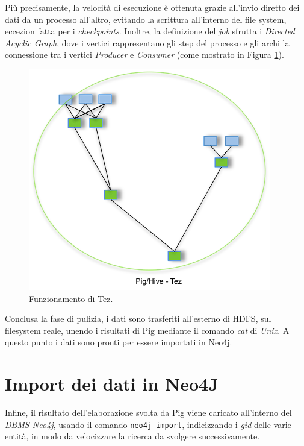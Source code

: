 \documentclass[12pt, a4paper, twocolumn]{article} %
\begin{document}
Più precisamente, la velocità di esecuzione è ottenuta grazie all'invio diretto dei dati da un processo all'altro, evitando la scrittura all'interno del file system, eccezion fatta per i \textit{checkpoints}.
Inoltre, la definizione del \textit{job} sfrutta i \textit{Directed Acyclic Graph}, dove i vertici rappresentano gli step del processo e gli archi la connessione tra i vertici \textit{Producer} e \textit{Consumer} (come mostrato in Figura \ref{fig:Tez}).

\begin{figure}
  \centering
  \includegraphics[width=0.9\linewidth]{tez.png}
  \caption{Funzionamento di Tez.}
  \label{fig:Tez}
\end{figure}

Conclusa la fase di pulizia, i dati sono trasferiti all'esterno di HDFS, sul filesystem reale, unendo i risultati di Pig  mediante il comando \textit{cat} di \textit{Unix}. 
A questo punto i dati sono pronti per essere importati in Neo4j.


\section{Import dei dati in Neo4J}
Infine, il risultato dell'elaborazione svolta da Pig viene caricato all'interno del \textit{DBMS Neo4j}, usando il comando \verb|neo4j-import|, indicizzando i \textit{gid} delle varie entità, in modo da velocizzare la ricerca da svolgere successivamente.
\end{document}
